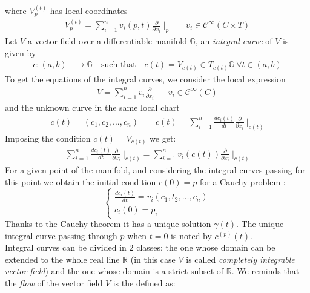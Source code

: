 where $V^{(t)}_{p} $ has local coordinates
\begin{align*}
V^{(t)}_{p} 
=\sum_{i=1}^{n}v_{i}(p,t) \frac{\partial}{\partial x_{i}}~\Bigr|_{p} 
\qquad  
v_{i} \in \mathcal{C}^{\infty}(C\times T)
\end{align*}
Let $V$ a vector field over a differentiable manifold $\mathbb{G}$, an \emph{integral curve} of $V$ is given by
	\begin{align*}
	c : (a,b) & \longrightarrow  \mathbb{G}  \quad \text{such that} \quad 
	\dot{c}(t) = V_{c(t)} \in T_{c(t)}\mathbb{G} ~\forall t\in (a,b)
	\end{align*}
To get the equations of the integral curves, we consider the local expression
\begin{align*}
V
= 
\sum_{i=1}^{n}v_{i} \frac{\partial}{\partial x_{i}} %
& & 
v_{i} \in \mathcal{C}^{\infty}(C)
\end{align*}
and the unknown curve in the same local chart
\begin{align*}
c(t) = (c_{1}, c_{2}, \dots , c_{n})
\qquad
\dot{c}(t)  = \sum_{i=1}^{n}   \frac{dc_{i}(t)}{dt}   \frac{\partial}{\partial x_{i}} ~\Bigr|_{c(t)} 
\end{align*}
Imposing the condition $\dot{c}(t) = V_{c(t)} $ we get:
\begin{align*}
\sum_{i=1}^{n}   \frac{dc_{i}(t)}{dt}   \frac{\partial}{\partial x_{i}} ~\Bigr|_{c(t)} 
= 
\sum_{i=1}^{n} v_{i}(c(t)) \frac{\partial}{\partial x_{i}} ~\Bigr|_{c(t)}  
\end{align*}
For a given point of the manifold, and considering the integral curves passing for this point we obtain the initial condition $c(0) = p$ for a Cauchy problem :
\begin{equation}
\begin{cases}
\frac{dc_{i}(t)}{dt}  =v_{i}(c_{1}, t_{2}, \dots , c_{n})  \\
c_{i}(0) = p_{i}
\end{cases}
\end{equation}
Thanks to the Cauchy theorem it has a unique solution $\gamma(t)$. The unique integral curve passing through $p$ when $t=0$ is noted by $ c^{(p)}(t)$. \\
Integral curves can be divided in $2$ classes: the one whose domain can be extended to the whole real line $\mathbb{R}$ (in this case $V$ is called \emph{completely integrable vector field}) and the one whose domain is a strict subset of $\mathbb{R}$.
We reminds that the \emph{flow} of the vector field $V$ is the defined as:
